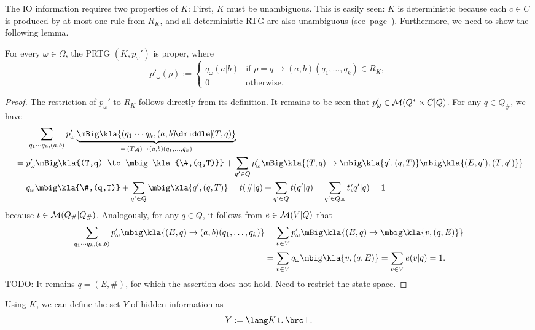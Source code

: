 The IO information requires two properties of $K$: First, $K$ must be
unambiguous. This is easily seen: $K$ is deterministic because each $c\in C$ is
produced by at most one rule from $R_K$, and all deterministic RTG are also
unambiguous (see~page~\pageref{lemma:02-deterministic-is-unambiguous}). Furthermore, we need to show the following lemma.

\begin{lemma}
 For every $\omega\in\Omega$, the PRTG $(K,p_\omega')$ is proper, where
 \[
  p'_\omega(\rho) := \begin{cases}
   q_\omega(a|b) & \text{if } \rho=q\to(a,b)(q_1,\ldots,q_k)\in R_K,
   \\ 0 & \text{otherwise}.
  \end{cases}
 \]
\end{lemma}

\begin{proof}
 The restriction of $p_\omega'$ to $R_K$ follows directly from its definition.
 It remains to be seen that $p_\omega'\in\mathcal M(Q^*\times C|Q)$. For any $q\in Q_\#$, we have
 \begin{align*}
  &\hspace{1.5em} \sum_{q_1\cdots q_k,(a,b)} p_\omega'\underbrace{\mBig\kla{(q_1\cdots q_k,(a,b)\npipe(T,q)}}_{=\,(T,q)\to(a,b)(q_1,\ldots,q_k)} \\
  &= p_\omega'\mBig\kla{(T,q) \to \mbig\kla{\#,(q,T)}} + \sum_{q'\in Q} p_\omega'\mBig\kla{(T,q) \to \mbig\kla{q',(q,T)}\mbig\kla{(E,q'),(T,q')}} \\
  &= q_\omega\mbig\kla{\#,(q,T)} + \sum_{q'\in Q} \mbig\kla{q',(q,T)} = t(\#|q) + \sum_{q'\in Q} t(q'|q) = \sum_{q'\in Q_\#} t(q'|q) = 1
 \end{align*}
 because $t\in\mathcal M(Q_\#|Q_\#)$. Analogously, for any $q\in Q$, it follows from $e\in\mathcal M(V|Q)$ that
 \begin{align*}
  \sum_{q_1\cdots q_k,(a,b)} p_\omega'\mbig\kla{(E,q)\to(a,b)(q_1,\ldots,q_k)}
  &= \sum_{v\in V} p_\omega'\mBig\kla{(E,q) \to \mbig\kla{v,(q,E)}} \\
  &= \sum_{v\in V} q_\omega\mbig\kla{v,(q,E)} = \sum_{v\in V} e(v|q) = 1.
  \qedhere
 \end{align*}
 {\color{red} TODO: It remains $q=(E,\#)$, for which the assertion does not hold. Need to restrict the state space.}
\end{proof}

Using $K$, we can define the set $Y$ of hidden information as
\[
 Y := \lang K \cup \brc\bot.
\]

